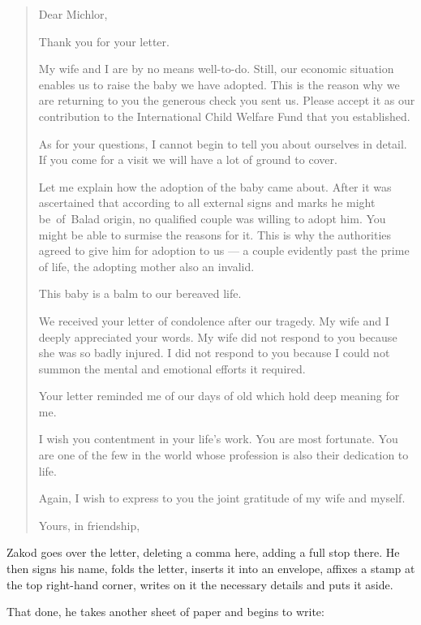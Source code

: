 \documentclass[twoside,11pt]{book}
\begin{document}
\begin{quotation}
Dear Michlor,

Thank you for your letter.

My wife and I are by no means well-to-do. Still, our economic situation enables us to raise the baby we have adopted.
This is the reason why we are returning to you the generous check you sent us. Please accept it as our contribution to
the International Child Welfare Fund that you established.

As for your questions, I cannot begin to tell you about ourselves in detail. If you come for a visit we will have a lot
of ground to cover.

Let me explain how the adoption of the baby came about.  After it was ascertained that according to all external signs
and marks he might be~of~Balad origin, no qualified couple was willing to adopt him. You might be able to surmise the
reasons for it. This is why the authorities agreed to give him for adoption to us --- a couple evidently past the prime
of life, the adopting mother also an invalid.

This baby is a balm to our bereaved life.

We received your letter of condolence after our tragedy. My wife and I deeply appreciated your words. My wife did not
respond to you because she was so badly injured. I did not respond to you because I could not summon the mental and
emotional efforts it required.

Your letter reminded me of our days of old which hold deep meaning for me.

I wish you contentment in your life's work. You are most fortunate. You are one of the few in the world whose profession
is also their dedication to life.

Again, I wish to express to you the joint gratitude of my wife and myself.

Yours, in friendship,
\end{quotation}

Zakod goes over the letter, deleting a comma here, adding a full stop there. He then signs his name, folds the letter,
inserts it into an envelope, affixes a stamp at the top right-hand corner, writes on it the necessary details and puts it
aside.

That done, he takes another sheet of paper and begins to write:
\end{document}
